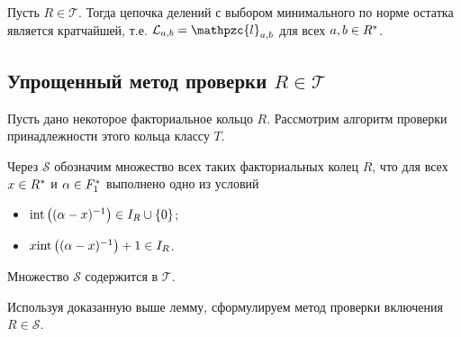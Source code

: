 \documentclass[_00_autoref.tex]{subfiles}
\begin{document}
\begin{theorem}\label{theorem:Kroneker_Vahlen_theorem_in_UFD}
    Пусть $R \in \mathcal{T}$.
    Тогда цепочка делений с выбором минимального по норме остатка является кратчайшей, т.е. $\mathcal{L}_{a, b} = \mathpzc{l}_{a, b}$ для всех $a, b \in R^{*}$.
\end{theorem}

\subsection{Упрощенный метод проверки $R \in \mathcal{T}$}

Пусть дано некоторое факториальное кольцо $R$.
Рассмотрим алгоритм проверки принадлежности этого кольца классу $T$.

\begin{definition}
    Через $\mathcal{S}$ обозначим множество всех таких факториальных колец $R$, что для всех $x \in R^{*}$ и $\alpha \in F_1^{*}$ выполнено одно из условий
    \begin{itemize}
        \item $\textrm{int}\left((\alpha - x)^{-1}\right) \in I_{R} \cup \{0\}$;
        
        \item $x \textrm{int}\left((\alpha - x)^{-1}\right) + 1 \in I_{R}$.
    \end{itemize}
\end{definition}

\begin{lemma}
    Множество $\mathcal{S}$ содержится в $\mathcal{T}$.
\end{lemma}

Используя доказанную выше лемму, сформулируем метод проверки включения $R \in \mathcal{S}$.
\end{document}
